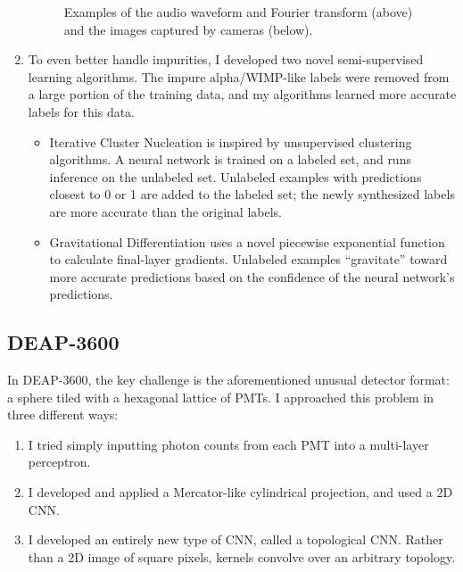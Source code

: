 \documentclass[12pt]{article}
\begin{document}
\begin{enumerate}
\begin{figure}[ht]
        \qquad
        \caption{Examples of the audio waveform and Fourier transform (above) and the images captured by cameras (below).}
    \end{figure}
    \item To even better handle impurities, I developed two novel semi-supervised learning algorithms. The impure alpha/WIMP-like labels were removed from a large portion of the training data, and my algorithms learned more accurate labels for this data.
    \begin{itemize}
        \item Iterative Cluster Nucleation is inspired by unsupervised clustering algorithms. A neural network is trained on a labeled set, and runs inference on the unlabeled set. Unlabeled examples with predictions closest to 0 or 1 are added to the labeled set; the newly synthesized labels are more accurate than the original labels.
        \item Gravitational Differentiation uses a novel piecewise exponential function to calculate final-layer gradients. Unlabeled examples ``gravitate'' toward more accurate predictions based on the confidence of the neural network's predictions.
    \end{itemize}
\end{enumerate}

\subsection{DEAP-3600}

In DEAP-3600, the key challenge is the aforementioned unusual detector format: a sphere tiled with a hexagonal lattice of PMTs. I approached this problem in three different ways:

\begin{enumerate}
    \item I tried simply inputting photon counts from each PMT into a multi-layer perceptron.
    \item I developed and applied a Mercator-like cylindrical projection, and used a 2D CNN.
    \item I developed an entirely new type of CNN, called a topological CNN. Rather than a 2D image of square pixels, kernels convolve over an arbitrary topology.
\end{enumerate}
\end{document}
